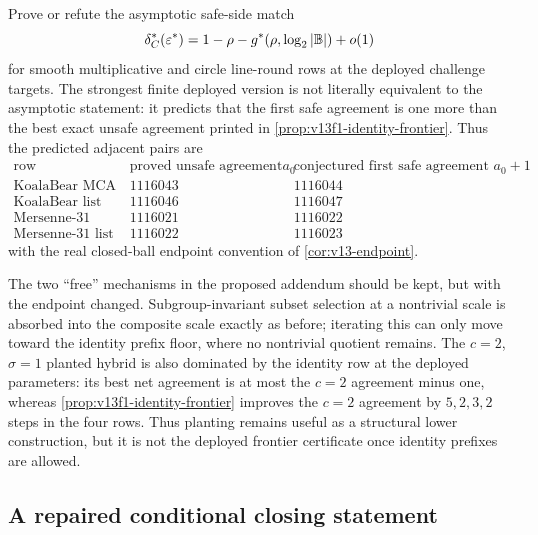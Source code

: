 \begin{problem}\label{prob:v13f1-frontier}
Prove or refute the asymptotic safe-side match
\[
        \delta^*_C(\varepsilon^*)=1-\rho-g^*(\rho,\log_2|\mathbb B|)+o(1)
\]
for smooth multiplicative and circle line-round rows at the deployed challenge targets.  The strongest finite deployed version is not literally equivalent to the asymptotic statement: it predicts that the first safe agreement is one more than the best exact unsafe agreement printed in \cref{prop:v13f1-identity-frontier}.  Thus the predicted adjacent pairs are
\[
\begin{array}{c|cc}
\text{row} & \text{proved unsafe agreement }a_0 & \text{conjectured first safe agreement }a_0+1\\ \hline
\text{KoalaBear MCA} & 1116043 & 1116044\\
\text{KoalaBear list} & 1116046 & 1116047\\
\text{Mersenne-31 MCA} & 1116021 & 1116022\\
\text{Mersenne-31 list} & 1116022 & 1116023
\end{array}
\]
with the real closed-ball endpoint convention of \cref{cor:v13-endpoint}.
\end{problem}

\begin{remark}[closure mechanisms after $c=1$]\label{rem:v13f1-closure}
The two ``free'' mechanisms in the proposed addendum should be kept, but with the endpoint changed.  Subgroup-invariant subset selection at a nontrivial scale is absorbed into the composite scale exactly as before; iterating this can only move toward the identity prefix floor, where no nontrivial quotient remains.  The $c=2$, $\sigma=1$ planted hybrid is also dominated by the identity row at the deployed parameters: its best net agreement is at most the $c=2$ agreement minus one, whereas \cref{prop:v13f1-identity-frontier} improves the $c=2$ agreement by $5,2,3,2$ steps in the four rows.  Thus planting remains useful as a structural lower construction, but it is not the deployed frontier certificate once identity prefixes are allowed.
\end{remark}

\subsection{A repaired conditional closing statement}

